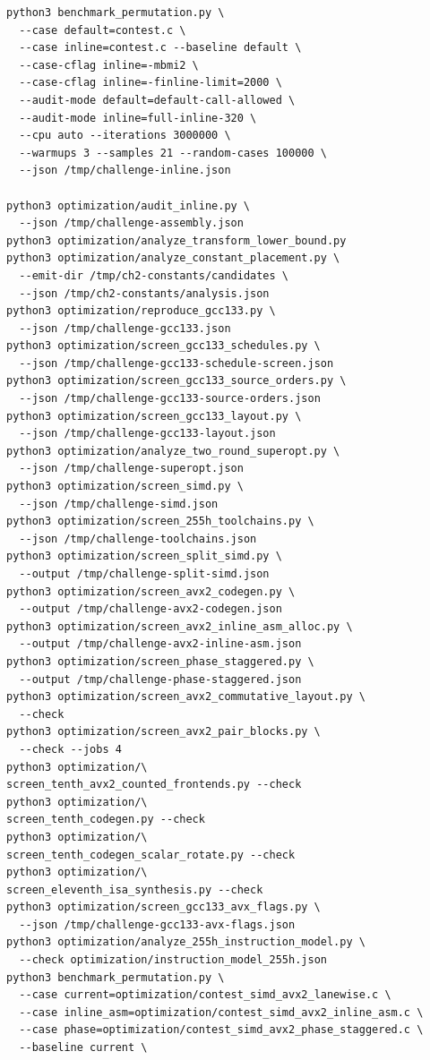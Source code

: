 \documentclass[11pt,a4paper]{article}
\begin{document}
\begin{lstlisting}
python3 benchmark_permutation.py \
  --case default=contest.c \
  --case inline=contest.c --baseline default \
  --case-cflag inline=-mbmi2 \
  --case-cflag inline=-finline-limit=2000 \
  --audit-mode default=default-call-allowed \
  --audit-mode inline=full-inline-320 \
  --cpu auto --iterations 3000000 \
  --warmups 3 --samples 21 --random-cases 100000 \
  --json /tmp/challenge-inline.json

python3 optimization/audit_inline.py \
  --json /tmp/challenge-assembly.json
python3 optimization/analyze_transform_lower_bound.py
python3 optimization/analyze_constant_placement.py \
  --emit-dir /tmp/ch2-constants/candidates \
  --json /tmp/ch2-constants/analysis.json
python3 optimization/reproduce_gcc133.py \
  --json /tmp/challenge-gcc133.json
python3 optimization/screen_gcc133_schedules.py \
  --json /tmp/challenge-gcc133-schedule-screen.json
python3 optimization/screen_gcc133_source_orders.py \
  --json /tmp/challenge-gcc133-source-orders.json
python3 optimization/screen_gcc133_layout.py \
  --json /tmp/challenge-gcc133-layout.json
python3 optimization/analyze_two_round_superopt.py \
  --json /tmp/challenge-superopt.json
python3 optimization/screen_simd.py \
  --json /tmp/challenge-simd.json
python3 optimization/screen_255h_toolchains.py \
  --json /tmp/challenge-toolchains.json
python3 optimization/screen_split_simd.py \
  --output /tmp/challenge-split-simd.json
python3 optimization/screen_avx2_codegen.py \
  --output /tmp/challenge-avx2-codegen.json
python3 optimization/screen_avx2_inline_asm_alloc.py \
  --output /tmp/challenge-avx2-inline-asm.json
python3 optimization/screen_phase_staggered.py \
  --output /tmp/challenge-phase-staggered.json
python3 optimization/screen_avx2_commutative_layout.py \
  --check
python3 optimization/screen_avx2_pair_blocks.py \
  --check --jobs 4
python3 optimization/\
screen_tenth_avx2_counted_frontends.py --check
python3 optimization/\
screen_tenth_codegen.py --check
python3 optimization/\
screen_tenth_codegen_scalar_rotate.py --check
python3 optimization/\
screen_eleventh_isa_synthesis.py --check
python3 optimization/screen_gcc133_avx_flags.py \
  --json /tmp/challenge-gcc133-avx-flags.json
python3 optimization/analyze_255h_instruction_model.py \
  --check optimization/instruction_model_255h.json
python3 benchmark_permutation.py \
  --case current=optimization/contest_simd_avx2_lanewise.c \
  --case inline_asm=optimization/contest_simd_avx2_inline_asm.c \
  --case phase=optimization/contest_simd_avx2_phase_staggered.c \
  --baseline current \

\end{lstlisting}
\end{document}
